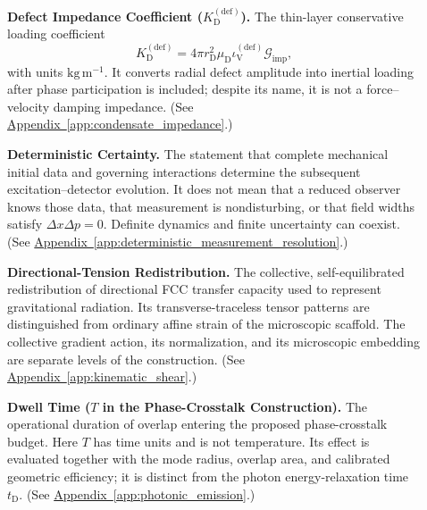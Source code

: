 \begin{description}
\item[] \begin{minipage}[t]{\linewidth}
\textbf{Defect Impedance Coefficient ($K_{\mathrm D}^{(\mathrm{def})}$).} The thin-layer conservative loading coefficient
\[
 K_{\mathrm D}^{(\mathrm{def})}
 =4\pi r_{\mathrm D}^2\mu_{\mathrm D}
   \iota_{\mathrm V}^{(\mathrm{def})}\mathcal G_{\mathrm{imp}},
\]
with units $\mathrm{kg\,m^{-1}}$. It converts radial defect amplitude into inertial loading after phase participation is included; despite its name, it is not a force--velocity damping impedance.
(See \hyperref[app:condensate_impedance]{Appendix~\ref*{app:condensate_impedance}}.)
\end{minipage}

\item[] \begin{minipage}[t]{\linewidth}
\textbf{Deterministic Certainty.} The statement that complete mechanical initial data and governing interactions determine the subsequent excitation--detector evolution. It does not mean that a reduced observer knows those data, that measurement is nondisturbing, or that field widths satisfy $\Delta x\Delta p=0$. Definite dynamics and finite uncertainty can coexist.
(See \hyperref[app:deterministic_measurement_resolution]{Appendix~\ref*{app:deterministic_measurement_resolution}}.)
\end{minipage}

\item[] \begin{minipage}[t]{\linewidth}
\textbf{Directional-Tension Redistribution.} The collective, self-equilibrated redistribution of directional FCC transfer capacity used to represent gravitational radiation. Its transverse-traceless tensor patterns are distinguished from ordinary affine strain of the microscopic scaffold. The collective gradient action, its normalization, and its microscopic embedding are separate levels of the construction.
(See \hyperref[app:kinematic_shear]{Appendix~\ref*{app:kinematic_shear}}.)
\end{minipage}

\item[] \begin{minipage}[t]{\linewidth}
\textbf{Dwell Time ($T$ in the Phase-Crosstalk Construction).} The operational duration of overlap entering the proposed phase-crosstalk budget. Here $T$ has time units and is not temperature. Its effect is evaluated together with the mode radius, overlap area, and calibrated geometric efficiency; it is distinct from the photon energy-relaxation time $t_{\mathrm D}$.
(See \hyperref[app:photonic_emission]{Appendix~\ref*{app:photonic_emission}}.)
\end{minipage}


\end{description}
